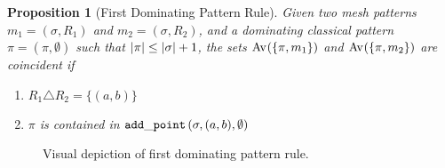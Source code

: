 \documentclass[11pt,a4paper]{article}
\newtheorem{proposition}[theorem]{Proposition}
\theoremstyle{definition}
\begin{document}
\begin{proposition}[First Dominating Pattern Rule]
    \label{prop:dom1}
    Given two mesh patterns \(m_1 =(\sigma, R_1)\) and \(m_2 = (\sigma, R_2)\),
    and a dominating classical pattern \(\pi = (\pi,\emptyset)\) such that
    \(\left|\pi\right| \le \left|\sigma\right| + 1\), the sets \(\operatorname{Av}_{}\!\left(\{\pi,m_1\}\right)\) and
    \(\operatorname{Av}_{}\!\left(\{\pi,m_2\}\right)\) are coincident if

    \begin{enumerate}
        \item \(R_1 \triangle R_2 = \{(a,b)\}\)
        \item \(\pi \) is contained in \( \mathtt{add\_point}\left(\sigma, (a,b), \emptyset\right)\)\label{prop:dom1:cont}
    \end{enumerate}
\end{proposition}

\begin{figure}[hbt]
    \begin{center}
        \raisebox{2ex}{\(\mapsto\)}

        \caption{Visual depiction of first dominating pattern rule.}
        \label{fig:rule1}
    \end{center}
\end{figure}
\end{document}
